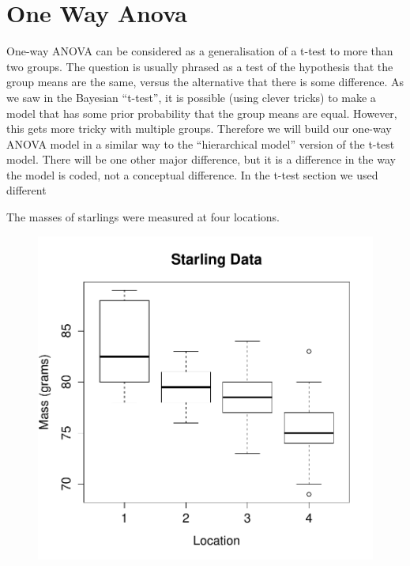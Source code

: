 \section{One Way Anova}
One-way ANOVA can be considered as a generalisation of a t-test to more than
two groups. The question is usually phrased as a test of the hypothesis that
the group means are the same, versus the alternative that there is some difference.
As we saw in the Bayesian ``t-test'', it is possible (using clever tricks) to
make a model that has some prior probability that the group means are equal.
However, this gets more tricky with multiple groups. Therefore we will build our
one-way ANOVA model in a similar way to the ``hierarchical model'' version of the
t-test model. There will be one other major difference, but it is a difference
in the way the model is coded, not a conceptual difference. In the t-test
section we used different 

The masses of starlings were measured at four locations.

\begin{figure}[ht!]
\begin{center}
\includegraphics[scale=0.6]{Figures/starling.pdf}
\end{center}
\end{figure}



